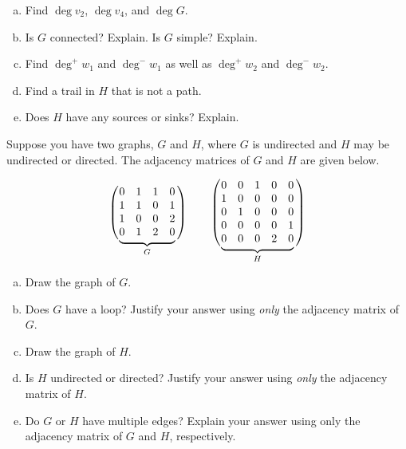 \documentclass[11pt,letterpaper]{article}
\begin{document}
\begin{enumerate}[(a)]
\item Find $\deg v_2$, $\deg v_4$, and $\deg G$.
\item Is $G$ connected? Explain. Is $G$ simple? Explain.
\item Find $\deg^+ \!w_1$ and $\deg^- \!w_1$ as well as $\deg^+ \!w_2$ and $\deg^- \!w_2$. 
\item Find a trail in $H$ that is not a path. 
\item Does $H$ have any sources or sinks? Explain. 
\end{enumerate}



\newpage



 Suppose you have two graphs, $G$ and $H$, where $G$ is undirected and $H$ may be undirected or directed. The adjacency matrices of $G$ and $H$ are given below. \par
	\def\matrixG{%
	\begin{matrix}
	0 & 1 & 1 & 0 \\
	1 & 1 & 0 & 1 \\
	1 & 0 & 0 & 2 \\
	0 & 1 & 2 & 0 
	\end{matrix}
	}%
	\def\matrixH{%
	\begin{matrix}
	0 & 0 & 1 & 0 & 0 \\
	1 & 0 & 0 & 0 & 0 \\
	0 & 1 & 0 & 0 & 0 \\
	0 & 0 & 0 & 0 & 1 \\
	0 & 0 & 0 & 2 & 0 
	\end{matrix}
	}%
	\[
	\left(\vphantom{\matrixG} \right.\kern-2\nulldelimiterspace
  \underbrace{\matrixG}_{G} \kern-\nulldelimiterspace\left.\vphantom{\matrixG} \right) \qquad
  	\left(\vphantom{\matrixH} \right.\kern-2\nulldelimiterspace
  \underbrace{\matrixH}_{H} \kern-\nulldelimiterspace\left.\vphantom{\matrixH} \right)
	\]

\begin{enumerate}[(a)]
\item Draw the graph of $G$.
\item Does $G$ have a loop? Justify your answer using \textit{only} the adjacency matrix of $G$.
\item Draw the graph of $H$.
\item Is $H$ undirected or directed? Justify your answer using \textit{only} the adjacency matrix of $H$.
\item Do $G$ or $H$ have multiple edges? Explain your answer using only the adjacency matrix of $G$ and $H$, respectively. 
\end{enumerate}
\end{document}
